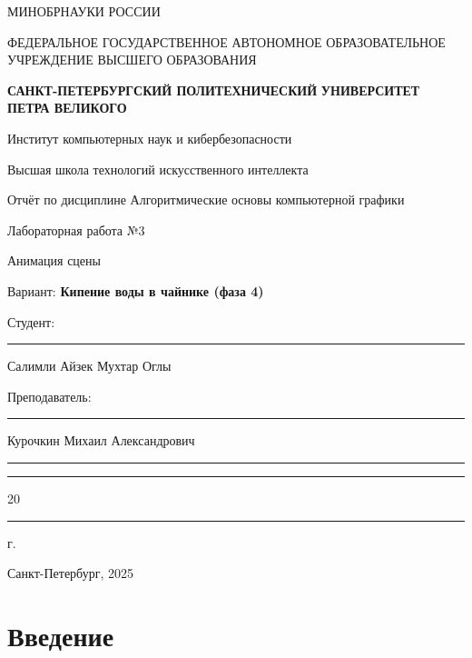 \documentclass[areasetadvanced]{scrartcl}
\begin{document}
\sloppy
	\thispagestyle{empty}
	\begin{center}
		\large{МИНОБРНАУКИ РОССИИ} \par
		\vspace{0.3cm}
		\normalsize
		{ФЕДЕРАЛЬНОЕ ГОСУДАРСТВЕННОЕ АВТОНОМНОЕ ОБРАЗОВАТЕЛЬНОЕ УЧРЕЖДЕНИЕ ВЫСШЕГО ОБРАЗОВАНИЯ} \par
		\vspace{0.3cm}
		\textbf{\guillemotleft САНКТ-ПЕТЕРБУРГСКИЙ ПОЛИТЕХНИЧЕСКИЙ}
		\textbf{УНИВЕРСИТЕТ ПЕТРА ВЕЛИКОГО\guillemotright} \par
		\vspace{0.3cm}
		{Институт компьютерных наук и кибербезопасности}\par
		{Высшая школа технологий искусственного интеллекта}\par
	\end{center}
	\vfill
	\begin{center}
		{\large Отчёт по дисциплине \guillemotleft Алгоритмические основы компьютерной графики\guillemotright}\par
		{\huge   Лабораторная работа №3
		
		\guillemotleft Анимация сцены\guillemotright}\par
            {\huge Вариант: \textbf{Кипение воды в чайнике (фаза 4)}}
         
	\end{center}
	\vfill
	\begin{flushleft}
		Студент: \hspace{1.8cm} \rule[0pt]{2.5cm}{0.5pt}\hfill Салимли Айзек Мухтар Оглы\par
		\vspace{1.5cm}
		Преподаватель: \hspace{0.55cm} \rule[0pt]{2.5cm}{0.5pt}\hfill  Курочкин Михаил Александрович
	\end{flushleft}
	\vspace{0.5cm}
	\begin{flushright}
		\guillemotleft \rule[0pt]{0.8cm}{0.5pt}\guillemotright \rule[0pt]{2cm}{0.5pt} 20\rule[0pt]{0.5cm}{0.5pt} г.
	\end{flushright}
	\vfill
	\begin{center}
		Санкт-Петербург, 2025
	\end{center}
	\newpage
	\tableofcontents
	\newpage
\section*{Введение}
\end{document}
